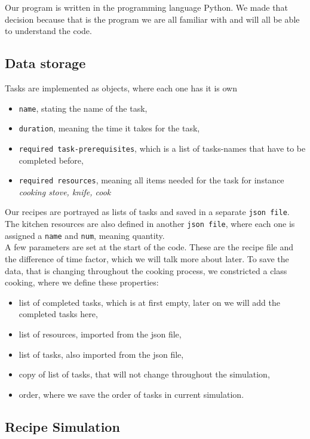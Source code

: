 
Our program is written in the programming language Python. We made that decision because that is the program we are all familiar with and will all be able to understand the code. 

\subsection{Data storage}

Tasks are implemented as objects, where each one has it is own 
\begin{itemize}
    \item \texttt{name}, stating the name of the task,
    \item \texttt{duration}, meaning the time it takes for the task,
    \item \texttt{required task-prerequisites}, which is a list of tasks-names that have to be completed before,
    \item \texttt{required resources}, meaning all items needed for the task
    for instance \textit{cooking stove, knife, cook}
\end{itemize}
Our recipes are portrayed as lists of tasks and saved in a separate \texttt{json file}. The kitchen resources are also defined in another \texttt{json file}, where each one is assigned a \texttt{name} and \texttt{num}, meaning quantity. \\
A few parameters are set at the start of the code. These are the recipe file and the difference of time factor, which we will talk more about later.
To save the data, that is changing throughout the cooking process, we constricted a class cooking, where we define these properties:
\begin{itemize}
    \item list of completed tasks, which is at first empty, later on we will add the completed tasks here,
    \item list of resources, imported from the json file,
    \item list of tasks, also imported from the json file,
    \item copy of list of tasks, that will not change throughout the simulation,
    \item order, where we save the order of tasks in current simulation.
\end{itemize}

\subsection{Recipe Simulation}

